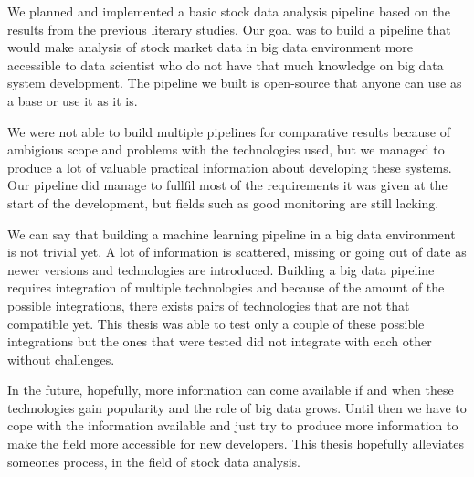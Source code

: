 We planned and implemented a basic stock data analysis pipeline based on the results from the previous literary studies.
Our goal was to build a pipeline that would make analysis of stock market data in big data environment more accessible to data scientist who do not have that much knowledge on big data system development.
The pipeline we built is open-source that anyone can use as a base or use it as it is.

We were not able to build multiple pipelines for comparative results because of ambigious scope and problems with the technologies used, but we managed to produce a lot of valuable practical information about developing these systems.
Our pipeline did manage to fullfil most of the requirements it was given at the start of the development, but fields such as good monitoring are still lacking.

We can say that building a machine learning pipeline in a big data environment is not trivial yet.
A lot of information is scattered, missing or going out of date as newer versions and technologies are introduced.
Building a big data pipeline requires integration of multiple technologies and because of the amount of the possible integrations, there  exists pairs of technologies that are not that compatible yet.
This thesis was able to test only a couple of these possible integrations but the ones that were tested did not integrate with each other without challenges.

In the future, hopefully, more information can come available if and when these technologies gain popularity and the role of big data grows.
Until then we have to cope with the information available and just try to produce more information to make the field more accessible for new developers.
This thesis hopefully alleviates someones process, in the field of stock data analysis.
